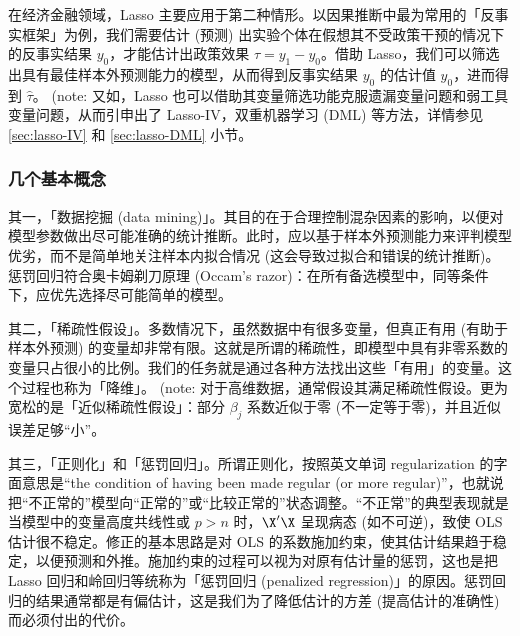 在经济金融领域，Lasso 主要应用于第二种情形。以因果推断中最为常用的「反事实框架」为例，我们需要估计 (预测) 出实验个体在假想其不受政策干预的情况下的反事实结果 $y_0$，才能估计出政策效果 $\tau = y_1 - y_0$。借助 Lasso，我们可以筛选出具有最佳样本外预测能力的模型，从而得到反事实结果 $y_0$ 的估计值 $\widehat{y}_0$，进而得到 $\widehat{\tau}$。 (note: %
又如，Lasso 也可以借助其变量筛选功能克服遗漏变量问题和弱工具变量问题，从而引申出了 Lasso-IV，双重机器学习 (DML) 等方法，详情参见 \ref{sec:lasso-IV} 和 \ref{sec:lasso-DML} 小节。 

\subsubsection{几个基本概念}

其一，「数据挖掘 (data mining)」。其目的在于合理控制混杂因素的影响，以便对模型参数做出尽可能准确的统计推断。此时，应以基于样本外预测能力来评判模型优劣，而不是简单地关注样本内拟合情况 (这会导致过拟合和错误的统计推断)。惩罚回归符合奥卡姆剃刀原理 (Occam's razor)：在所有备选模型中，同等条件下，应优先选择尽可能简单的模型。

其二，「稀疏性假设」。多数情况下，虽然数据中有很多变量，但真正有用 (有助于样本外预测) 的变量却非常有限。这就是所谓的稀疏性，即模型中具有非零系数的变量只占很小的比例。我们的任务就是通过各种方法找出这些「有用」的变量。这个过程也称为「降维」。 (note: %
对于高维数据，通常假设其满足稀疏性假设。更为宽松的是「近似稀疏性假设\label{page:稀疏性假设}」：部分 $\beta_{j}$ 系数近似于零 (不一定等于零)，并且近似误差足够“小”。



其三，「正则化」和「惩罚回归」。所谓正则化，按照英文单词 regularization 的字面意思是“the condition of having been made regular (or more regular)”，也就说把“不正常的”模型向“正常的”或“比较正常的”状态调整。“不正常”的典型表现就是当模型中的变量高度共线性或 $p>n$ 时，$\X'\X$ 呈现病态 (如不可逆)，致使 OLS 估计很不稳定。修正的基本思路是对 OLS 的系数施加约束，使其估计结果趋于稳定，以便预测和外推。施加约束的过程可以视为对原有估计量的惩罚，这也是把 Lasso 回归和岭回归等统称为「惩罚回归 (penalized regression)」的原因。惩罚回归的结果通常都是有偏估计，这是我们为了降低估计的方差 (提高估计的准确性) 而必须付出的代价。  

